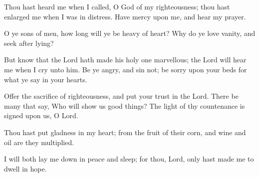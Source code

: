 Thou hast heard me when I called, O God of my righteousness; thou hast enlarged me when I was in distress. Have mercy upon me, and hear my prayer.

O ye sons of men, how long will ye be heavy of heart? Why do ye love vanity, and seek after lying?

But know that the Lord hath made his holy one marvellous; the Lord will hear me when I cry unto him.
Be ye angry, and sin not; be sorry upon your beds for what ye say in your hearts.

Offer the sacrifice of righteousness, and put your trust in the Lord. There be many that say, Who will show us good things? The light of thy countenance is signed upon us, O Lord.

Thou hast put gladness in my heart; from the fruit of their corn, and wine and oil are they multiplied.

I will both lay me down in peace and sleep; for thou, Lord, only hast made me to dwell in hope.
